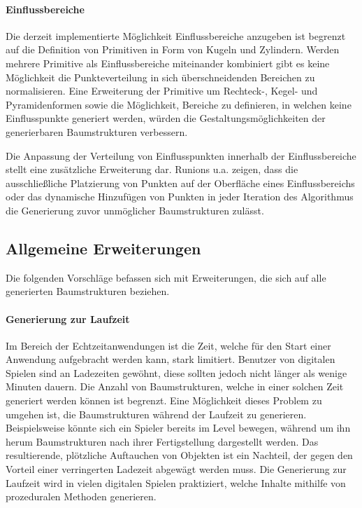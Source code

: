 \paragraph{Einflussbereiche} 

Die derzeit implementierte Möglichkeit Einflussbereiche anzugeben ist begrenzt auf die Definition von Primitiven in Form von Kugeln und Zylindern. Werden mehrere Primitive als Einflussbereiche miteinander kombiniert gibt es keine Möglichkeit die Punkteverteilung in sich überschneidenden Bereichen zu normalisieren. Eine Erweiterung der Primitive um Rechteck-, Kegel- und Pyramidenformen sowie die Möglichkeit, Bereiche zu definieren, in welchen keine Einflusspunkte generiert werden, würden die Gestaltungsmöglichkeiten der generierbaren Baumstrukturen verbessern. 

Die Anpassung der Verteilung von Einflusspunkten innerhalb der Einflussbereiche stellt eine zusätzliche Erweiterung dar. Runions u.a. zeigen, dass die ausschließliche Platzierung von Punkten auf der Oberfläche eines Einflussbereichs oder das dynamische Hinzufügen von Punkten in jeder Iteration des Algorithmus die Generierung zuvor unmöglicher Baumstrukturen zulässt. \cite[S.5f]{ABOP:04}

\subsection{Allgemeine Erweiterungen}

Die folgenden Vorschläge befassen sich mit Erweiterungen, die sich auf alle generierten Baumstrukturen beziehen.

\paragraph{Generierung zur Laufzeit}

Im Bereich der Echtzeitanwendungen ist die Zeit, welche für den Start einer Anwendung aufgebracht werden kann, stark limitiert. Benutzer von digitalen Spielen sind an Ladezeiten gewöhnt, diese sollten jedoch nicht länger als wenige Minuten dauern. Die Anzahl von Baumstrukturen, welche in einer solchen Zeit generiert werden können ist begrenzt. Eine Möglichkeit dieses Problem zu umgehen ist, die Baumstrukturen während der Laufzeit zu generieren. Beispielsweise könnte sich ein Spieler bereits im Level bewegen, während um ihn herum Baumstrukturen nach ihrer Fertigstellung dargestellt werden. Das resultierende, plötzliche Auftauchen von Objekten ist ein Nachteil, der gegen den Vorteil einer verringerten Ladezeit abgewägt werden muss. Die Generierung zur Laufzeit wird in vielen digitalen Spielen praktiziert, welche Inhalte mithilfe von prozeduralen Methoden generieren.

